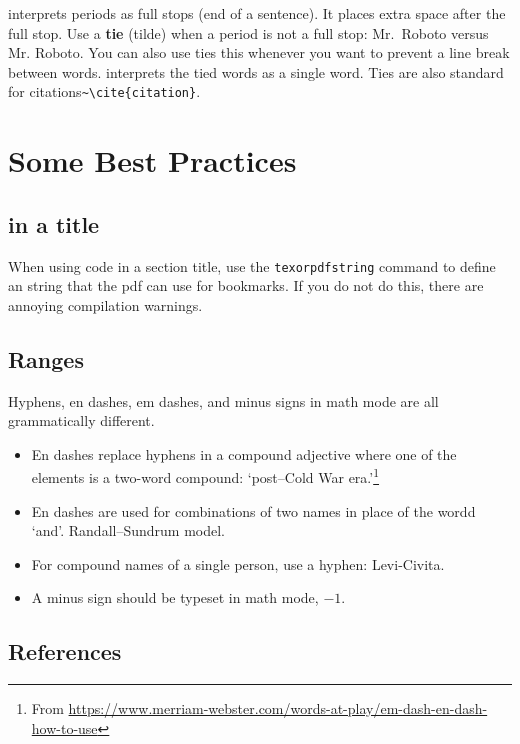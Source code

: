 \LaTeXx interprets periods as full stops (end of a sentence). It places extra space after the full stop. Use a \textbf{tie} (tilde) when a period is not a full stop: Mr.~Roboto versus Mr. Roboto. 
% 
You can also use ties this whenever you want to prevent a line break between words. \LaTeXx interprets the tied words as a single word.
% 
Ties are also standard for citations\verb!~\cite{citation}!.



\section{Some Best Practices}

\subsection{\texorpdfstring{\LaTeXx in a title}{LaTeX in a title}}

When using \LaTeXx code in a section title, use the \texttt{texorpdfstring} command to define an  string that the pdf can use for bookmarks. If you do not do this, there are annoying compilation warnings.


\subsection{Ranges}

Hyphens, en dashes, em dashes, and minus signs in math mode are all grammatically different.
\begin{itemize}
	\item En dashes replace hyphens in a compound adjective where one of the elements is a two-word compound: `post--Cold War era.'\footnote{From \url{https://www.merriam-webster.com/words-at-play/em-dash-en-dash-how-to-use}}
	\item En dashes are used for combinations of two names in place of the wordd `and'. Randall--Sundrum model.
	\item For compound names of a single person, use a hyphen: Levi-Civita.
	\item A minus sign should be typeset in math mode, $-1$.
\end{itemize}


\subsection{References}

